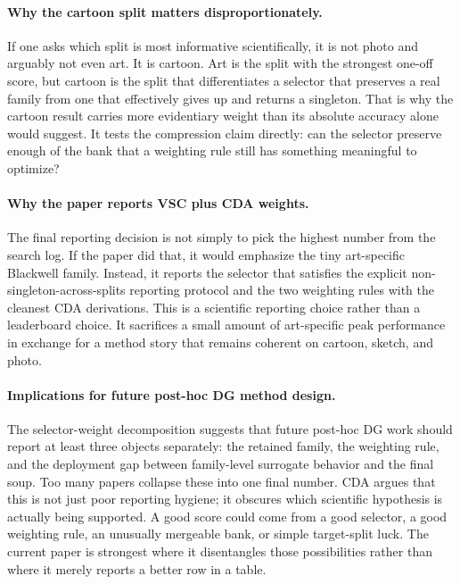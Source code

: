 \documentclass{article}
\theoremstyle{definition}
\begin{document}
\paragraph{Why the cartoon split matters disproportionately.}
If one asks which split is most informative scientifically, it is not photo and arguably not even art. It is cartoon. Art is the split with the strongest one-off score, but cartoon is the split that differentiates a selector that preserves a real family from one that effectively gives up and returns a singleton. That is why the cartoon result carries more evidentiary weight than its absolute accuracy alone would suggest. It tests the compression claim directly: can the selector preserve enough of the bank that a weighting rule still has something meaningful to optimize?

\paragraph{Why the paper reports VSC plus CDA weights.}
The final reporting decision is not simply to pick the highest number from the search log. If the paper did that, it would emphasize the tiny art-specific Blackwell family. Instead, it reports the selector that satisfies the explicit non-singleton-across-splits reporting protocol and the two weighting rules with the cleanest CDA derivations. This is a scientific reporting choice rather than a leaderboard choice. It sacrifices a small amount of art-specific peak performance in exchange for a method story that remains coherent on cartoon, sketch, and photo.

\paragraph{Implications for future post-hoc DG method design.}
The selector-weight decomposition suggests that future post-hoc DG work should report at least three objects separately: the retained family, the weighting rule, and the deployment gap between family-level surrogate behavior and the final soup. Too many papers collapse these into one final number. CDA argues that this is not just poor reporting hygiene; it obscures which scientific hypothesis is actually being supported. A good score could come from a good selector, a good weighting rule, an unusually mergeable bank, or simple target-split luck. The current paper is strongest where it disentangles those possibilities rather than where it merely reports a better row in a table.
\end{document}
